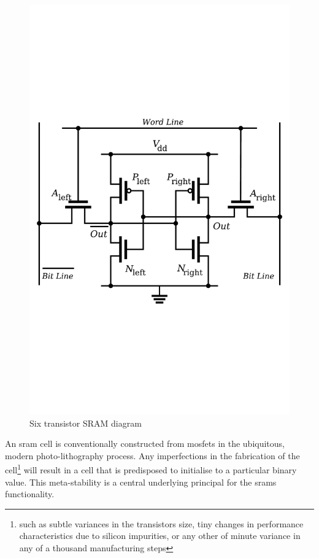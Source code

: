 \begin{figure}
  \centering
  \includegraphics[scale=0.4, trim=0 300 0 300, clip]{images/sram}
  \caption{Six transistor SRAM diagram}
  \label{sram}
\end{figure}

An \gls{sram} cell is conventionally constructed from \glspl{mosfet} in the
ubiquitous, modern photo-lithography process.
Any imperfections in the fabrication of the cell\footnote{such as subtle 
variances in the transistors size, tiny changes in performance
characteristics due to silicon impurities, or any other of minute variance in
any of a thousand manufacturing steps} will result in a cell that is
predisposed to initialise to a particular binary value.
This meta-stability is a central underlying principal for the \glspl{sram}
functionality.

